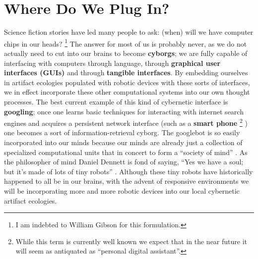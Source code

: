 \section{Where Do We Plug In?}
%
Science fiction stories have led many people to ask: (when) will we have computer chips in our heads?%
\footnote{I am indebted to William Gibson \citeyearpar{gibson_distrust} for this formulation.} 
The answer for most of us is probably never, as we do not actually need to cut into our brains to become \textbf{cyborgs}; we are fully capable of interfacing with computers through language, through \textbf{graphical user interfaces (GUIs)} and through \textbf{tangible interfaces}.
By embedding ourselves in artifact ecologies populated with robotic devices with these sorts of interfaces, we in effect incorporate these other computational systems into our own thought processes.
The best current example of this kind of cybernetic interface is \textbf{googling}; once one learns basic techniques for interacting with internet search engines and acquires a persistent network interface (such as a \textbf{smart phone}%
\footnote{While this term is currently well known we expect that in the near future it will seem as antiquated as ``personal digital assistant''.}%
) one becomes a sort of information-retrieval cyborg.
The googlebot is so easily incorporated into our minds because our minds are already just a collection of specialized computational units that in concert to form a ``society of mind'' \citep{society_of_mind}. 
As the philosopher of mind Daniel Dennett is fond of saying, ``Yes we have a soul; but it's made of lots of tiny robots'' \citeyearpar[][p. 1]{freedom_evolves}. Although these tiny robots have historically happened to all be in our brains, with the advent of responsive environments we will be incorporating more and more robotic devices into our local cybernetic artifact ecologies.

